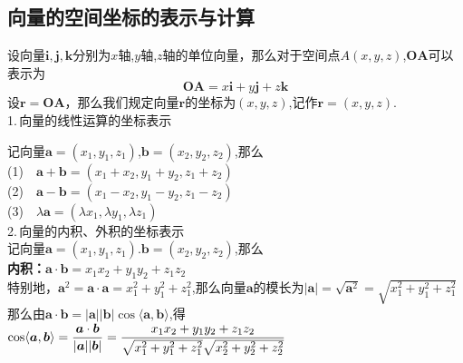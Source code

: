 \subsection{向量的空间坐标的表示与计算}
设向量$\boldsymbol{i},\boldsymbol{j},\boldsymbol{k}$分别为$x$轴,$y$轴,$z$轴的单位向量，那么对于空间点$A(x,y,z)$,$\boldsymbol{OA}$可以表示为
\begin{equation}
	\boldsymbol{OA}=x\boldsymbol{i}+y\boldsymbol{j}+z\boldsymbol{k}
\end{equation}
设$\boldsymbol{r}=\boldsymbol{OA}$，那么我们规定向量$\boldsymbol{r}$的坐标为$(x,y,z)$,记作$\boldsymbol{r}=(x,y,z)$.\\
1.$\,$向量的线性运算的坐标表示
\par 记向量$\boldsymbol{a}=(x_1,y_1,z_1)$,$\boldsymbol{b}=(x_2,y_2,z_2)$,那么\\
(1)$\quad \boldsymbol{a}+\boldsymbol{b}=(x_1+x_2,y_1+y_2,z_1+z_2)$\\
(2)$\quad \boldsymbol{a}-\boldsymbol{b}=(x_1-x_2,y_1-y_2,z_1-z_2)$\\
(3)$\quad \lambda \boldsymbol{a}=(\lambda x_1,\lambda y_1,\lambda z_1)$\\
2.$\,$向量的内积、外积的坐标表示\\
记向量$\boldsymbol{a}=(x_1,y_1,z_1).\boldsymbol{b}=(x_2,y_2,z_2)$,那么\\
\textbf{内积：}$\boldsymbol{a}\cdot\boldsymbol{b}=x_1x_2+y_1y_2+z_1z_2$\\
特别地，$\boldsymbol{a}^2=\boldsymbol{a}\cdot\boldsymbol{a}=x_1^2+y_1^2+z_1^2$,那么向量$\boldsymbol{a}$的模长为$|\boldsymbol{a}|=\sqrt{\boldsymbol{a}^2}=\sqrt{x_1^2+y_1^2+z_1^2}$\\

\noindent 那么由$\boldsymbol{a}\cdot\boldsymbol{b}=|\boldsymbol{a}||\boldsymbol{b}|\cos\langle \boldsymbol{a},\boldsymbol{b}\rangle$,得$\displaystyle\cos\langle \boldsymbol{a},\boldsymbol{b}\rangle=\frac{\boldsymbol{a}\cdot\boldsymbol{b}}{|\boldsymbol{a}||\boldsymbol{b}|}=\frac{x_1x_2+y_1y_2+z_1z_2}{\sqrt{x_1^2+y_1^2+z_1^2}\sqrt{x_2^2+y_2^2+z_2^2}}$\\


